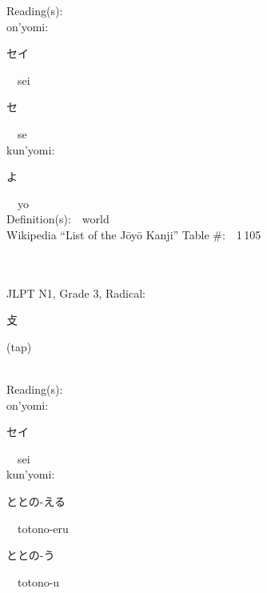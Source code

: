\begin{multicols}{2}
Reading(s):\ \ \\
{\hspace*{1em}}on'yomi:\ \ \\
{\hspace*{2em}}{\begin{CJK}{UTF8}{min} セイ \end{CJK}}\ \ sei\ \ \\
{\hspace*{2em}}{\begin{CJK}{UTF8}{min} セ \end{CJK}}\ \ se\ \ \\
{\hspace*{1em}}kun'yomi:\ \ \\
{\hspace*{2em}}{\begin{CJK}{UTF8}{min} よ \end{CJK}}\ \ yo\ \ \\
Definition(s):\ \ world \\
Wikipedia ``List of the J\=oy\=o Kanji'' Table \#:\ \ 1\,105 \\
\ \ \\
{\fontsize{34pt}{40pt}  }\ \ \\  %
{JLPT N1, Grade 3, Radical:\ \ {\begin{CJK}{UTF8}{min} 攴 \end{CJK}} (tap) } \\
Reading(s):\ \ \\
{\hspace*{1em}}on'yomi:\ \ \\
{\hspace*{2em}}{\begin{CJK}{UTF8}{min} セイ \end{CJK}}\ \ sei\ \ \\
{\hspace*{1em}}kun'yomi:\ \ \\
{\hspace*{2em}}{\begin{CJK}{UTF8}{min} ととの-える \end{CJK}}\ \ totono-eru\ \ \\
{\hspace*{2em}}{\begin{CJK}{UTF8}{min} ととの-う \end{CJK}}\ \ totono-u\ \ \\

\end{multicols}
